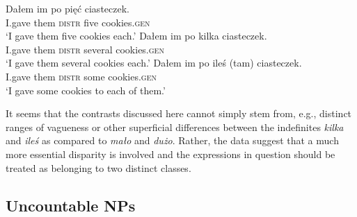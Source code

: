\documentclass[output=paper,
]{langscibook}
\begin{document}
	\ea \label{ex:distributive-po-cardinals} \ea \gll Dałem im po pięć ciasteczek.\\
	I.gave them \textsc{distr} five cookies.\textsc{gen}\\
	\glt `I gave them five cookies each.'
	\ex \gll Dałem im po kilka ciasteczek.\\
	I.gave them \textsc{distr} several cookies.\textsc{gen}\\
	\glt `I gave them several cookies each.'
	\ex \gll Dałem im po {ileś (tam)} ciasteczek.\\
	I.gave them \textsc{distr} some cookies.\textsc{gen}\\
	\glt `I gave some cookies to each of them.'
	\z
    \z

	\ea \label{ex:distributive-po-malo} 
	\z
    \z

	\noindent It seems that the contrasts discussed here cannot simply stem from, e.g., distinct ranges of vagueness or other superficial differences between the indefinites \textit{kilka} and \textit{ileś} as compared to \textit{mało} and \textit{dużo}. Rather, the data suggest that a much more essential disparity is involved and the expressions in question should be treated as belonging to two distinct classes.
	
	\subsection{Uncountable NPs}\label{sec:uncountable-nps}
	
\end{document}
